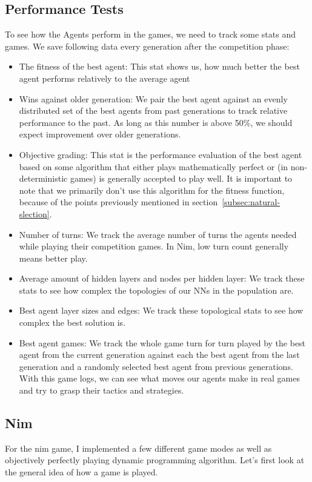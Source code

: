 \documentclass[11pt]{report}
\begin{document}
\begin{enumerate}
    \subsection{Performance Tests}\label{subsec:performance-tests}
    To see how the Agents perform in the games, we need to track some stats and games.
    We save following data every generation after the competition phase:
    \begin{itemize}
        \item The fitness of the best agent: This stat shows us, how much better the best agent performs relatively to the average agent
        \item Wins against older generation: We pair the best agent against an evenly distributed set of the best agents from past generations to track relative performance to the past.
        As long as this number is above 50\%, we should expect improvement over older generations.
        \item Objective grading: This stat is the performance evaluation of the best agent based on some algorithm that either plays mathematically perfect or (in non-deterministic games) is generally accepted to play well.
        It is important to note that we primarily don't use this algorithm for the fitness function, because of the points previously mentioned in section~\ref{subsec:natural-slection}.
        \item Number of turns: We track the average number of turns the agents needed while playing their competition games.
        In Nim, low turn count generally means better play.
        \item Average amount of hidden layers and nodes per hidden layer: We track these stats to see how complex the topologies of our NNs in the population are.
        \item Best agent layer sizes and edges: We track these topological stats to see how complex the best solution is.
        \item Best agent games: We track the whole game turn for turn played by the best agent from the current generation against each the best agent from the last generation and a randomly selected best agent from previous generations.
        With this game logs, we can see what moves our agents make in real games and try to grasp their tactics and strategies.
    \end{itemize}
            \subsection{Nim}\label{subsec:nim-implementation}
    For the nim game, I implemented a few different game modes as well as objectively perfectly playing dynamic programming algorithm.
    Let's first look at the general idea of how a game is played.

\end{enumerate}
\end{document}
